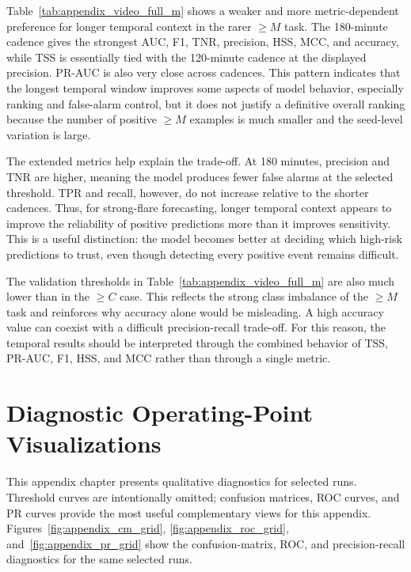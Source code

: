 \FloatBarrier

Table~\ref{tab:appendix_video_full_m} shows a weaker and more metric-dependent preference for longer temporal context in the rarer $\geq M$ task. The 180-minute cadence gives the strongest AUC, F1, TNR, precision, HSS, MCC, and accuracy, while TSS is essentially tied with the 120-minute cadence at the displayed precision. PR-AUC is also very close across cadences. This pattern indicates that the longest temporal window improves some aspects of model behavior, especially ranking and false-alarm control, but it does not justify a definitive overall ranking because the number of positive $\geq M$ examples is much smaller and the seed-level variation is large.

The extended metrics help explain the trade-off. At 180 minutes, precision and TNR are higher, meaning the model produces fewer false alarms at the selected threshold. TPR and recall, however, do not increase relative to the shorter cadences. Thus, for strong-flare forecasting, longer temporal context appears to improve the reliability of positive predictions more than it improves sensitivity. This is a useful distinction: the model becomes better at deciding which high-risk predictions to trust, even though detecting every positive event remains difficult.

The validation thresholds in Table~\ref{tab:appendix_video_full_m} are also much lower than in the $\geq C$ case. This reflects the strong class imbalance of the $\geq M$ task and reinforces why accuracy alone would be misleading. A high accuracy value can coexist with a difficult precision-recall trade-off. For this reason, the temporal results should be interpreted through the combined behavior of TSS, PR-AUC, F1, HSS, and MCC rather than through a single metric.

\FloatBarrier

\chapter{Diagnostic Operating-Point Visualizations}
\label{app:diagnostic_visualizations}

This appendix chapter presents qualitative diagnostics for selected runs. Threshold curves are intentionally omitted; confusion matrices, ROC curves, and PR curves provide the most useful complementary views for this appendix. Figures~\ref{fig:appendix_cm_grid}, \ref{fig:appendix_roc_grid}, and~\ref{fig:appendix_pr_grid} show the confusion-matrix, ROC, and precision-recall diagnostics for the same selected runs.


